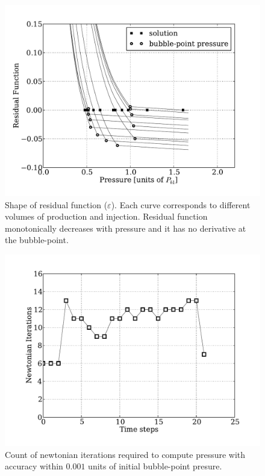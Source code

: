 \documentclass[final,authoryear,5p,times,twocolumn,10pt]{elsarticle}
\begin{document}
\begin{figure}
\centering
\includegraphics[width=\linewidth]{./python/matbal_res}
\caption{Shape of residual function ($\varepsilon$). Each curve corresponds to different volumes of production and injection. Residual function monotonically decreases with pressure and it has no derivative at the bubble-point.}
\label{fig: epsilon}
\end{figure}

\begin{figure}
\centering
\includegraphics[width=\linewidth]{./python/matbal_iter}
\caption{Count of newtonian iterations required to compute pressure with accuracy within $0.001$ units of initial bubble-point presure.}
\label{fig: iter}
\end{figure}
\end{document}
